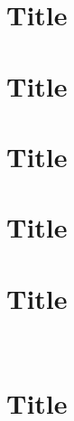 \documentclass[a4paper,12pt,twoside,openright]{report}
\begin{document}
\pagestyle{empty}
\singlespacing

\onehalfspacing

\singlespacing


\setcounter{page}{0}
\pagestyle{plain}
\tableofcontents
\listoffigures
\listoftables

\onehalfspacing


\chapter{Title}
\setcounter{page}{1} 

\chapter{Title} 

\chapter{Title}

\chapter{Title}

\chapter{Title}
\
\chapter{Title}


\appendix
\singlespacing

\printbibliography
\end{document}
